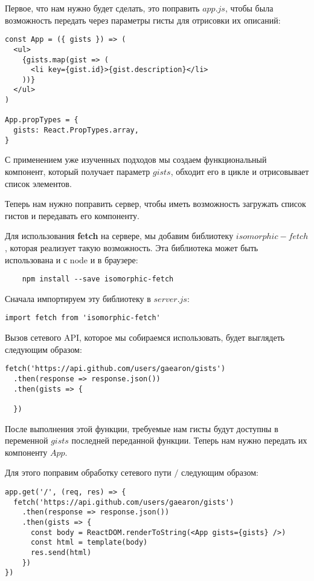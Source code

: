 Первое, что нам нужно будет сделать, это поправить $app.js$, чтобы была возможность передать через параметры гисты для отрисовки их описаний:

\begin{lstlisting}
const App = ({ gists }) => (
  <ul>
    {gists.map(gist => (
      <li key={gist.id}>{gist.description}</li>
    ))} 
  </ul>
)

App.propTypes = {
  gists: React.PropTypes.array,
}
\end{lstlisting}

С применением уже изученных подходов мы создаем функциональный компонент, который получает параметр $gists$, обходит его в цикле и отрисовывает список элементов.

Теперь нам нужно поправить сервер, чтобы иметь возможность загружать список гистов и передавать его компоненту.

Для использования \textbf{fetch} на сервере, мы добавим библиотеку $isomorphic-fetch$, которая реализует такую возможность. Эта библиотека может быть использована и с node и в браузере:

\begin{lstlisting}
	npm install --save isomorphic-fetch
\end{lstlisting}

Сначала импортируем эту библиотеку в $server.js$:

\begin{lstlisting}
import fetch from 'isomorphic-fetch'	
\end{lstlisting}

Вызов сетевого API, которое мы собираемся использовать, будет выглядеть следующим образом:

\begin{lstlisting}
fetch('https://api.github.com/users/gaearon/gists')
  .then(response => response.json())
  .then(gists => {
  
  })
\end{lstlisting}


После выполнения этой функции, требуемые нам гисты будут доступны в переменной $gists$ последней переданной функции. Теперь нам нужно передать их компоненту $App$.

Для этого поправим обработку сетевого пути $/$ следующим образом:

\begin{lstlisting}
app.get('/', (req, res) => {
  fetch('https://api.github.com/users/gaearon/gists')
    .then(response => response.json())
    .then(gists => {
      const body = ReactDOM.renderToString(<App gists={gists} />)
      const html = template(body)
      res.send(html)
    })
})
\end{lstlisting}

